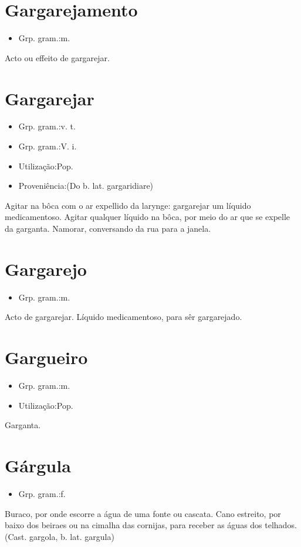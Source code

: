 \section{Gargarejamento}
\begin{itemize}
\item {Grp. gram.:m.}
\end{itemize}
Acto ou effeito de gargarejar.
\section{Gargarejar}
\begin{itemize}
\item {Grp. gram.:v. t.}
\end{itemize}
\begin{itemize}
\item {Grp. gram.:V. i.}
\end{itemize}
\begin{itemize}
\item {Utilização:Pop.}
\end{itemize}
\begin{itemize}
\item {Proveniência:(Do b. lat. \textunderscore gargaridiare\textunderscore )}
\end{itemize}
Agitar na bôca com o ar expellido da larynge: \textunderscore gargarejar um líquido medicamentoso\textunderscore .
Agitar qualquer líquido na bôca, por meio do ar que se expelle da garganta.
Namorar, conversando da rua para a janela.
\section{Gargarejo}
\begin{itemize}
\item {Grp. gram.:m.}
\end{itemize}
Acto de gargarejar.
Líquido medicamentoso, para sêr gargarejado.
\section{Gargueiro}
\begin{itemize}
\item {Grp. gram.:m.}
\end{itemize}
\begin{itemize}
\item {Utilização:Pop.}
\end{itemize}
Garganta.
\section{Gárgula}
\begin{itemize}
\item {Grp. gram.:f.}
\end{itemize}
Buraco, por onde escorre a água de uma fonte ou cascata.
Cano estreito, por baixo dos beiraes ou na cimalha das cornijas, para receber as águas dos telhados.
(Cast. \textunderscore gargola\textunderscore , b. lat. \textunderscore gargula\textunderscore )

